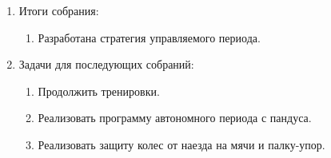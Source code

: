 \begin{enumerate}
\begin{enumerate}
\begin{enumerate}
			\end{enumerate}
		
	\end{enumerate}
	
	\item Итоги собрания:
	\begin{enumerate}
		
		\item Разработана стратегия управляемого периода.
		
	\end{enumerate}
	
	\item Задачи для последующих собраний:
	\begin{enumerate}
		
		\item Продолжить тренировки.
		
		\item Реализовать программу автономного периода с пандуса.
		
		\item Реализовать защиту колес от наезда на мячи и палку-упор.
			
	\end{enumerate}
\end{enumerate}
\fillpage
